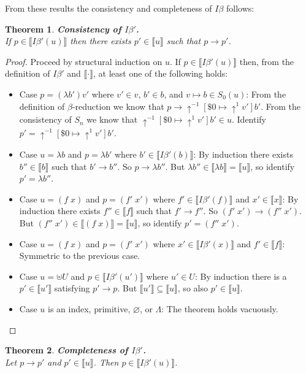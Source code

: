 \documentclass{article}
\newcommand{\denotation}[1]{{\llbracket #1 \rrbracket}}
\newcommand{\shift}[1]{\uparrow^{#1}}
\newcommand{\reduce}{\longrightarrow}
\newtheorem{theorem}{Theorem}
\begin{document}
From these results the consistency and completeness of $I\beta$ follows:
\begin{theorem}
  \textbf{Consistency of $I\beta'$.}\\
  If $p\in \denotation{I\beta'(u)}$ then there exists $p'\in \denotation{u}$ such that $p\reduce p'$.
\end{theorem}
\begin{proof}
  Proceed by structural induction on $u$. If $p\in \denotation{I\beta'(u)}$ then, from the definition of $I\beta'$ and $\denotation{\cdot }$, at least one of the following holds:
  \begin{itemize}
  \item Case $p = (\lambda b')v'$ where $v'\in v$, $b'\in b$, and $v\mapsto b\in S_0(u)$:
    From the definition of $\beta$-reduction we know that $p\reduce \shift{-1}[\$0\mapsto \shift{1}v']b'$.
    From the consistency of $S_n$ we know that $\shift{-1}[\$0\mapsto \shift{1}v']b'\in u$.
    Identify $p' = \shift{-1}[\$0\mapsto \shift{1}v']b'$.
  \item Case $u = \lambda b$ and $p = \lambda b'$
    where $b'\in \denotation{I\beta'(b)}$:
    By induction there exists $b''\in \denotation{b}$ such that $b'\reduce b''$.
    So $p \reduce \lambda b''$.
    But $\lambda b''\in \denotation{\lambda b} = \denotation{u}$,
    so identify $p' = \lambda b''$.
  \item Case $u = (f\; x)$ and $p = (f'\; x')$ where $f'\in \denotation{I\beta'(f)}$ and $x'\in \denotation{x}$:
    By induction there exists $f''\in \denotation{f}$
    such that $f'\reduce f''$.
    So $(f'\;x')\reduce (f''\;x')$.
    But $(f''\;x')\in \denotation{(f\;x)} = \denotation{u}$,
    so identify $p' = (f''\;x')$.
  \item  Case $u = (f\; x)$ and $p = (f'\; x')$ where $x'\in \denotation{I\beta'(x)}$ and $f'\in \denotation{f}$: Symmetric to the previous case.
  \item Case $u = \uplus U$ and $p \in \denotation{I\beta'(u')}$ where $u'\in U$:
    By induction there is a $p'\in \denotation{u'}$ satisfying $p'\reduce p$.
    But $\denotation{u'}\subseteq \denotation{u}$, so also $p'\in \denotation{u}$.
  \item Case $u$ is an index, primitive, $\varnothing$, or $\Lambda$: The theorem holds vacuously.    
    \end{itemize}  
\end{proof}
\begin{theorem}
  \textbf{Completeness of $I\beta'$.}\\
  Let $p\reduce p'$ and $p'\in \denotation{u}$.
  Then $p\in \denotation{I\beta'(u)}$.
\end{theorem}
\end{document}
